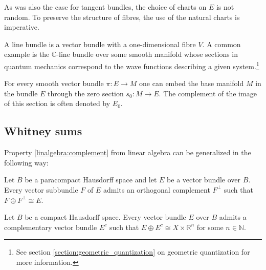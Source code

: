     \begin{remark}
        As was also the case for tangent bundles, the choice of charts on $E$ is not random. To preserve the structure of fibres, the use of the natural charts is imperative.
    \end{remark}

    \begin{example}
        A line bundle is a vector bundle with a one-dimensional fibre $V$. A common example is the $\mathbb{C}$-line bundle over some smooth manifold whose sections in quantum mechanics correspond to the wave functions describing a given system.\footnote{See section \ref{section:geometric_quantization} on geometric quantization for more information.}
    \end{example}

    \begin{property}\label{diff:zero_section}
        For every smooth vector bundle $\pi:E\rightarrow M$ one can embed the base manifold $M$ in the bundle $E$ through the zero section $s_0:M\rightarrow E$. The complement of the image of this section is often denoted by $E_0$.
    \end{property}

\subsection{Whitney sums}


    Property \ref{linalgebra:complement} from linear algebra can be generalized in the following way:
    \begin{property}
        Let $B$ be a paracompact Hausdorff space and let $E$ be a vector bundle over $B$. Every vector subbundle $F$ of $E$ admits an orthogonal complement $F^\perp$ such that $F\oplus F^\perp\cong E$.
    \end{property}
    \begin{property}\label{bundles:prop:hausdorff}
        Let $B$ be a compact Hausdorff space. Every vector bundle $E$ over $B$ admits a complementary vector bundle $E^c$ such that $E\oplus E^c \cong X\times\mathbb{R}^n$ for some $n\in\mathbb{N}$.
    \end{property}

